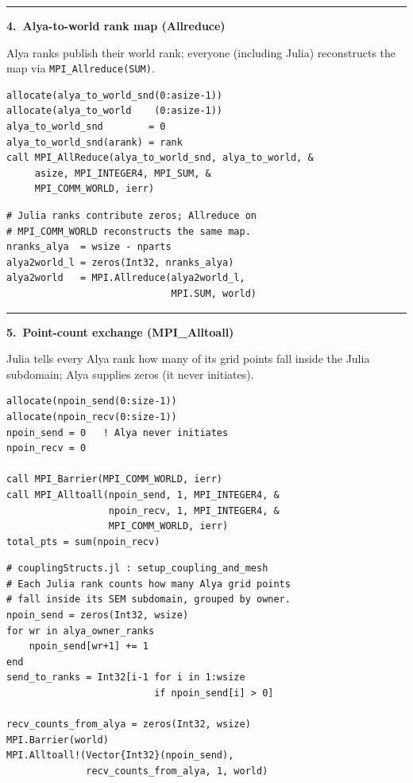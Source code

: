 \documentclass[10pt,landscape]{article}
\newlength{\stepW}\setlength{\stepW}{3.0cm}
\newlength{\codeW}\setlength{\codeW}{10.6cm}
\newcommand{\stepHdr}[1]{%
  \par\medskip
  \noindent\textcolor{ruleC}{\rule{\linewidth}{0.3pt}}\par
  \noindent\textbf{#1}\par\smallskip
}
\begin{document}
\stepHdr{4.\ Alya-to-world rank map (Allreduce)}
\noindent
\begin{minipage}[t]{\stepW}
\footnotesize Alya ranks publish their world rank; everyone (including Julia) reconstructs the map via \texttt{MPI\_Allreduce(SUM)}.
\end{minipage}\hfill
\begin{minipage}[t]{\codeW}
\begin{lstlisting}[style=fortran]
allocate(alya_to_world_snd(0:asize-1))
allocate(alya_to_world    (0:asize-1))
alya_to_world_snd        = 0
alya_to_world_snd(arank) = rank
call MPI_AllReduce(alya_to_world_snd, alya_to_world, &
     asize, MPI_INTEGER4, MPI_SUM, &
     MPI_COMM_WORLD, ierr)
\end{lstlisting}
\end{minipage}\hfill
\begin{minipage}[t]{\codeW}
\begin{lstlisting}[style=julia]
# Julia ranks contribute zeros; Allreduce on
# MPI_COMM_WORLD reconstructs the same map.
nranks_alya  = wsize - nparts
alya2world_l = zeros(Int32, nranks_alya)
alya2world   = MPI.Allreduce(alya2world_l,
                             MPI.SUM, world)
\end{lstlisting}
\end{minipage}

\stepHdr{5.\ Point-count exchange (MPI\_Alltoall)}
\noindent
\begin{minipage}[t]{\stepW}
\footnotesize Julia tells every Alya rank how many of its grid points fall inside the Julia subdomain; Alya supplies zeros (it never initiates).
\end{minipage}\hfill
\begin{minipage}[t]{\codeW}
\begin{lstlisting}[style=fortran]
allocate(npoin_send(0:size-1))
allocate(npoin_recv(0:size-1))
npoin_send = 0   ! Alya never initiates
npoin_recv = 0

call MPI_Barrier(MPI_COMM_WORLD, ierr)
call MPI_Alltoall(npoin_send, 1, MPI_INTEGER4, &
                  npoin_recv, 1, MPI_INTEGER4, &
                  MPI_COMM_WORLD, ierr)
total_pts = sum(npoin_recv)
\end{lstlisting}
\end{minipage}\hfill
\begin{minipage}[t]{\codeW}
\begin{lstlisting}[style=julia]
# couplingStructs.jl : setup_coupling_and_mesh
# Each Julia rank counts how many Alya grid points
# fall inside its SEM subdomain, grouped by owner.
npoin_send = zeros(Int32, wsize)
for wr in alya_owner_ranks
    npoin_send[wr+1] += 1
end
send_to_ranks = Int32[i-1 for i in 1:wsize
                          if npoin_send[i] > 0]

recv_counts_from_alya = zeros(Int32, wsize)
MPI.Barrier(world)
MPI.Alltoall!(Vector{Int32}(npoin_send),
              recv_counts_from_alya, 1, world)
\end{lstlisting}
\end{minipage}
\end{document}
